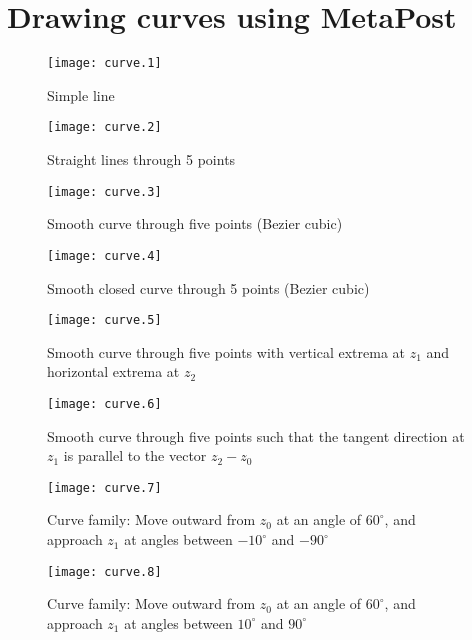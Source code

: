 \documentclass{article}
\begin{document}
\section{Drawing curves using MetaPost}

\begin{figure}[htb]
\begin{center}
\texttt{[image: curve.1]}
\caption{Simple line}
\end{center}
\end{figure}

\begin{figure}[htb]
\begin{center}
\texttt{[image: curve.2]}
\caption{Straight lines through 5 points}
\end{center}
\end{figure}

\begin{figure}[htb]
\begin{center}
\texttt{[image: curve.3]}
\caption{Smooth curve through five points (Bezier cubic)}
\end{center}
\end{figure}

\begin{figure}[htb]
\begin{center}
\texttt{[image: curve.4]}
\caption{Smooth closed curve through 5 points (Bezier cubic)}
\end{center}
\end{figure}

\begin{figure}[htb]
\begin{center}
\texttt{[image: curve.5]}
\caption{Smooth curve through five points with vertical extrema at $z_1$ and horizontal extrema at $z_2$}
\end{center}
\end{figure}

\begin{figure}[htb]
\begin{center}
\texttt{[image: curve.6]}
\caption{Smooth curve through five points such that the tangent direction at $z_1$ is parallel to the vector $z_2-z_0$}
\end{center}
\end{figure}

\begin{figure}[htb]
\begin{center}
\texttt{[image: curve.7]}
\caption{Curve family: Move outward from $z_0$ at an angle of $60^\circ$, and approach $z_1$ at angles between $-10^\circ$ and $-90^\circ$}
\end{center}
\end{figure}

\begin{figure}[htb]
\begin{center}
\texttt{[image: curve.8]}
\caption{Curve family: Move outward from $z_0$ at an angle of $60^\circ$, and approach $z_1$ at angles between $10^\circ$ and $90^\circ$}
\end{center}
\end{figure}
\end{document}

